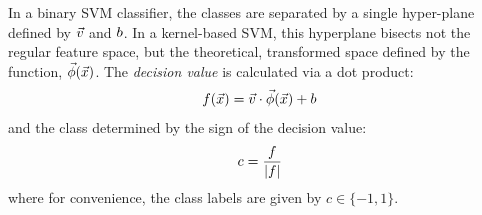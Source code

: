 \documentclass[11pt]{article}
\begin{document}
In a binary SVM classifier, the classes are separated by a single hyper-plane
defined by $\vec v$ and $b$.
In a kernel-based SVM, this hyperplane bisects not the regular feature
space, but the theoretical, transformed space defined by the function,
$\vec\phi(\vec {x})$.
The {\it decision value} is calculated via a dot product:
\begin{equation}
	f(\vec {x})=\vec v \cdot \vec\phi(\vec {x}) + b
	\label{decision_function0}
\end{equation}
and the class determined by the sign of the decision value:
\begin{equation}
	c=\frac{f}{|f|}
	\label{class_value}
\end{equation}
where for convenience, the class labels are given by $c \in \lbrace -1, 1 \rbrace$.
\end{document}
